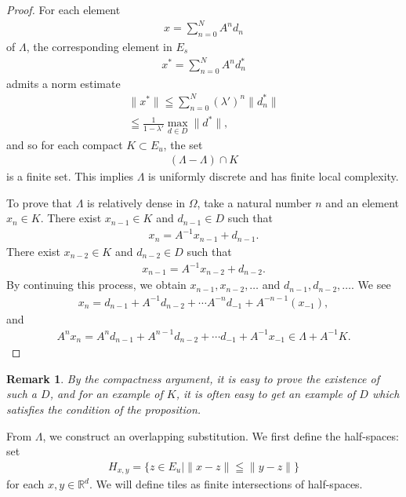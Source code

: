 \documentclass[a4]{amsart}
\newtheorem{rem}{Remark}[section]
\theoremstyle{definition}
\begin{document}
\begin{proof}
    For each element 
    \begin{align*}
       x=\sum_{n=0}^NA^nd_n 
    \end{align*}
    of $\Lambda$, the corresponding
    element in $E_s$
    \begin{align*}
        x^*=\sum_{n=0}^NA^nd_n^*
    \end{align*}
    admits a norm estimate
    \begin{align*}
        \|x^*\|\leqq\sum_{n=0}^N(\lambda')^n\|d_n^*\|\\
        \leqq\frac{1}{1-\lambda'}\max_{d\in D}\|d^*\|,
    \end{align*}
    and so for each compact $K\subset E_u$, the set
    \begin{align*}
        (\Lambda-\Lambda)\cap K
    \end{align*}
    is a finite set. This implies 
    $\Lambda$ is uniformly discrete
    and has finite local complexity.

    To prove that $\Lambda$ is relatively
    dense in $\Omega$, take a natural 
    number $n$ and an
    element $x_n\in K$. There exist
    $x_{n-1}\in K$ and $d_{n-1}\in D$
    such that
    \begin{align*}
        x_n=A^{-1}x_{n-1}+d_{n-1}.
    \end{align*}
    There exist $x_{n-2}\in K$ and
    $d_{n-2}\in D$ such that
    \begin{align*}
        x_{n-1}=A^{-1}x_{n-2}+d_{n-2}.
    \end{align*}
    By continuing this process, we obtain
    $x_{n-1},x_{n-2},\ldots$ and
    $d_{n-1},d_{n-2},\ldots$. We see
    \begin{align*}
        x_n=d_{n-1}+A^{-1}d_{n-2}+\cdots
        A^{-n}d_{-1}+A^{-n-1}(x_{-1}),
    \end{align*}
    and
    \begin{align*}
        A^nx_n=A^nd_{n-1}+A^{n-1}d_{n-2}+\cdots d_{-1}+A^{-1}x_{-1}\in\Lambda+A^{-1}K.
    \end{align*}
\end{proof}
\begin{rem}
    By the compactness argument, it is
    easy to prove the existence of such
    a $D$, and for an example of $K$,
    it is often easy to get an example
    of $D$ which satisfies the condition
    of the proposition.
\end{rem}
From $\Lambda$, we construct an overlapping substitution.
We first define the half-spaces: set
\begin{align*}
 H_{x,y}=\{z\in E_u\mid \|x-z\|\leqq \|y-z\|\}
\end{align*}
for each $x,y\in\mathbb{R}^d$.
We will define tiles as finite 
intersections of half-spaces.
\end{document}
